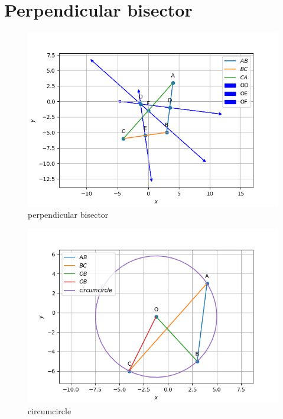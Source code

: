 \documentclass[book,11pt]{IEEEtran}
\begin{document}
\section{Perpendicular bisector}

\begin{figure}[H]
\includegraphics[width=\columnwidth]{figs/main7.png}
\caption{perpendicular bisector}
\label{fig:i_triangle_py}
\end{figure}
\begin{figure}[H]
\includegraphics[width=\columnwidth]{figs/main10.png}
\caption{circumcircle}
\label{fig:i_triangle_py}
\end{figure}
\end{document}

